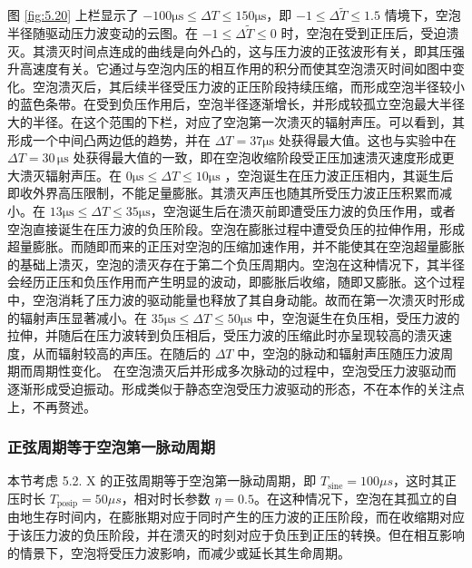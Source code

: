 图 \ref{fig:5.20} 上栏显示了
$-100\mathrm{\mu s}\leq\Delta T\leq150\mathrm{\mu s}$，即
$-1\leq\Delta \tilde{T} \leq1.5$
情境下，空泡半径随驱动压力波变动的云图。在
$-1\leq\Delta \tilde{T} \leq0$
时，空泡在受到正压后，受迫溃灭。其溃灭时间点连成的曲线是向外凸的，这与压力波的正弦波形有关，即其压强升高速度有关。它通过与空泡内压的相互作用的积分而使其空泡溃灭时间如图中变化。空泡溃灭后，其后续半径受压力波的正压阶段持续压缩，而形成空泡半径较小的蓝色条带。在受到负压作用后，空泡半径逐渐增长，并形成较孤立空泡最大半径大的半径。在这个范围的下栏，对应了空泡第一次溃灭的辐射声压。可以看到，其形成一个中间凸两边低的趋势，并在
$\Delta T=37\mathrm{\mu s}$ 处获得最大值。这也与实验中在
$\Delta T=30\,\mathrm{\mu s}$
处获得最大值的一致，即在空泡收缩阶段受正压加速溃灭速度形成更大溃灭辐射声压。在
$0\mathrm{\mu s}\leq\Delta T\leq10\mathrm{\mu s}$
，空泡诞生在压力波正压相内，其诞生后即收外界高压限制，不能足量膨胀。其溃灭声压也随其所受压力波正压积累而减小。在
$13\mathrm{\mu s}\leq\Delta T\leq35\mathrm{\mu s}$，空泡诞生后在溃灭前即遭受压力波的负压作用，或者空泡直接诞生在压力波的负压阶段。空泡在膨胀过程中遭受负压的拉伸作用，形成超量膨胀。而随即而来的正压对空泡的压缩加速作用，并不能使其在空泡超量膨胀的基础上溃灭，空泡的溃灭存在于第二个负压周期内。空泡在这种情况下，其半径会经历正压和负压作用而产生明显的波动，即膨胀后收缩，随即又膨胀。这个过程中，空泡消耗了压力波的驱动能量也释放了其自身动能。故而在第一次溃灭时形成的辐射声压显著减小。在
$35\mathrm{\mu s}\leq\Delta T\leq50\mathrm{\mu s}$
中，空泡诞生在负压相，受压力波的拉伸，并随后在压力波转到负压相后，受压力波的压缩此时亦呈现较高的溃灭速度，从而辐射较高的声压。在随后的
$\Delta T$ 中，空泡的脉动和辐射声压随压力波周期而周期性变化。
在空泡溃灭后并形成多次脉动的过程中，空泡受压力波驱动而逐渐形成受迫振动。形成类似于静态空泡受压力波驱动的形态，不在本作的关注点上，不再赘述。

\medskip
\bigskip
\subsubsection{正弦周期等于空泡第一脉动周期}

本节考虑 5.2. X 的正弦周期等于空泡第一脉动周期，即
$T_\mathrm{sine}=100 \mu s$，这时其正压时长
$T_\mathrm{posip}=50\mu s$，相对时长参数
$\eta =0.5$。在这种情况下，空泡在其孤立的自由地生存时间内，在膨胀期对应于同时产生的压力波的正压阶段，而在收缩期对应于该压力波的负压阶段，并在溃灭的时刻对应于负压到正压的转换。但在相互影响的情景下，空泡将受压力波影响，而减少或延长其生命周期。

